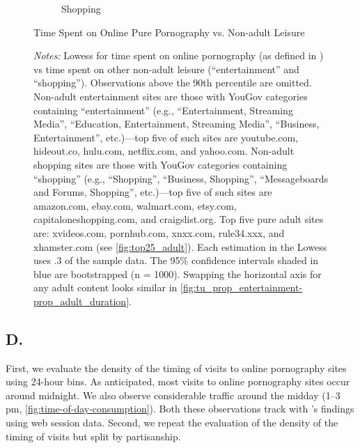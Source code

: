\documentclass[12pt,twoside]{article}
\begin{document}
\begin{figure}[!h]
\begin{subfigure}[b]{0.495\textwidth}
         \caption{Shopping}
     \end{subfigure}
\caption{Time Spent on Online Pure Pornography vs. Non-adult Leisure}
\caption*{\footnotesize \emph{Notes:}
Lowess for time spent on online pornography (as defined in ) vs time spent on other non-adult leisure (``entertainment'' and ``shopping'').
Observations above the 90th percentile are omitted. 
Non-adult entertainment sites are those with YouGov categories containing ``entertainment'' (e.g., ``Entertainment, Streaming Media'', ``Education, Entertainment, Streaming Media'', ``Business, Entertainment'', etc.)---top five of such sites are youtube.com, hideout.co, hulu.com, netflix.com, and yahoo.com.
Non-adult shopping sites are those with YouGov categories containing ``shopping'' (e.g., ``Shopping'', ``Business, Shopping'', ``Messageboards and Forums, Shopping'', etc.)---top five of such sites are amazon.com, ebay.com, walmart.com, etsy.com, capitaloneshopping.com, and craigslist.org.
Top five pure adult sites are: xvideos.com, pornhub.com, xnxx.com, rule34.xxx, and xhamster.com (see \cref{fig:top25_adult}).
Each estimation in the Lowess uses .3 of the sample data.
The 95\% confidence intervals shaded in blue are bootstrapped (n = 1000).
Swapping the horizontal axis for any adult content looks similar in \cref{fig:tu_prop_entertainment-prop_adult_duration}. 
}
\end{figure}


\clearpage
\setcounter{table}{0}
\setcounter{figure}{0}
\setcounter{equation}{0}
\FloatBarrier
\renewcommand{\thetable}{D\arabic{table}}
\renewcommand{\thefigure}{D\arabic{figure}}
\renewcommand{\theequation}{D\arabic{equation}}
\subsection{D. \smDTitle{}}\label{sm:smD}

First, we evaluate the density of the timing of visits to online pornography sites using 24-hour bins. As anticipated, most visits to online pornography sites occur around midnight. We also observe considerable traffic around the midday (1--3 pm, \cref{fig:time-of-day-consumption}). Both these observations track with \cite{webporn}'s findings using web session data. Second, we repeat the evaluation of the density of the timing of visits but split by partisanship.
\end{document}
